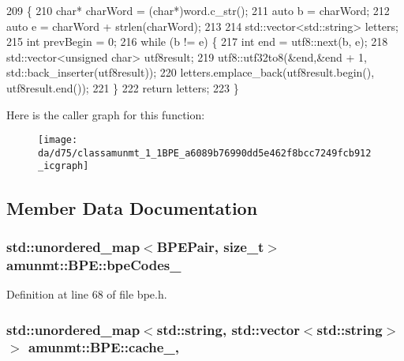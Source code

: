 \begin{DoxyCode}
209                                                                           \{
210   \textcolor{keywordtype}{char}* charWord = (\textcolor{keywordtype}{char}*)word.c\_str();
211   \textcolor{keyword}{auto} b = charWord;
212   \textcolor{keyword}{auto} e = charWord + strlen(charWord);
213 
214   std::vector<std::string> letters;
215   \textcolor{keywordtype}{int} prevBegin = 0;
216   \textcolor{keywordflow}{while} (b != e) \{
217     \textcolor{keywordtype}{int} end = utf8::next(b, e);
218     std::vector<unsigned char> utf8result;
219     utf8::utf32to8(&end,&end + 1, std::back\_inserter(utf8result));
220     letters.emplace\_back(utf8result.begin(), utf8result.end());
221   \}
222   \textcolor{keywordflow}{return} letters;
223 \}
\end{DoxyCode}


Here is the caller graph for this function\+:
\nopagebreak
\begin{figure}[H]
\begin{center}
\leavevmode
\texttt{[image: da/d75/classamunmt\_1\_1BPE\_a6089b76990dd5e462f8bcc7249fcb912\_icgraph]}
\end{center}
\end{figure}




\subsection{Member Data Documentation}
\subsubsection[{\texorpdfstring{bpe\+Codes\+\_\+}{bpeCodes_}}]{\setlength{\rightskip}{0pt plus 5cm}std\+::unordered\+\_\+map$<${\bf B\+P\+E\+Pair}, size\+\_\+t$>$ amunmt\+::\+B\+P\+E\+::bpe\+Codes\+\_\+\hspace{0.3cm}{\ttfamily [private]}}\hypertarget{classamunmt_1_1BPE_a4f76078a35e375984a320271f4f40fa5}{}\label{classamunmt_1_1BPE_a4f76078a35e375984a320271f4f40fa5}


Definition at line 68 of file bpe.\+h.

\subsubsection[{\texorpdfstring{cache\+\_\+}{cache_}}]{\setlength{\rightskip}{0pt plus 5cm}std\+::unordered\+\_\+map$<$std\+::string, std\+::vector$<$std\+::string$>$ $>$ amunmt\+::\+B\+P\+E\+::cache\+\_\+\hspace{0.3cm}{\ttfamily [mutable]}, {\ttfamily [private]}}\hypertarget{classamunmt_1_1BPE_a13eb53ebc158d710ac9ce969ce6b3b71}{}\label{classamunmt_1_1BPE_a13eb53ebc158d710ac9ce969ce6b3b71}


